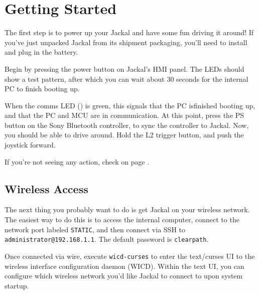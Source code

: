 \documentclass[]{clearpath-manual}
\begin{document}

\section{Getting Started}

The first step is to power up your Jackal and have some fun driving it around! If you've
just unpacked Jackal from its shipment packaging, you'll need to install and plug in the
battery.

Begin by pressing the power button on Jackal's HMI panel. The LEDs should show a test
pattern, after which you can wait about 30 seconds for the internal PC to finish booting
up.

When the comms LED () is
green, this signals that the PC isfinished booting up, and that the PC and MCU are in
communication. At this point, press the PS button on the Sony Bluetooth controller, to
sync the controller to Jackal. Now, you should be able to drive around. Hold the L2 trigger
button, and push the joystick forward.

If you're not seeing any action, check  on page \pageref{trouble}.

\subsection{Wireless Access}

The next thing you probably want to do is get Jackal on your wireless network. The
easiest way to do this is to access the internal computer, connect to the network port
labeled \lstinline{STATIC}, and then connect via SSH to
\lstinline{administrator@192.168.1.1}. The default password is \lstinline{clearpath}.

Once connected via wire, execute \lstinline{wicd-curses} to enter the text/curses UI to the
wireless interface configuration daemon (WICD). Within the text UI, you can configure
which wireless network you'd like Jackal to connect to upon system startup.
\end{document}
